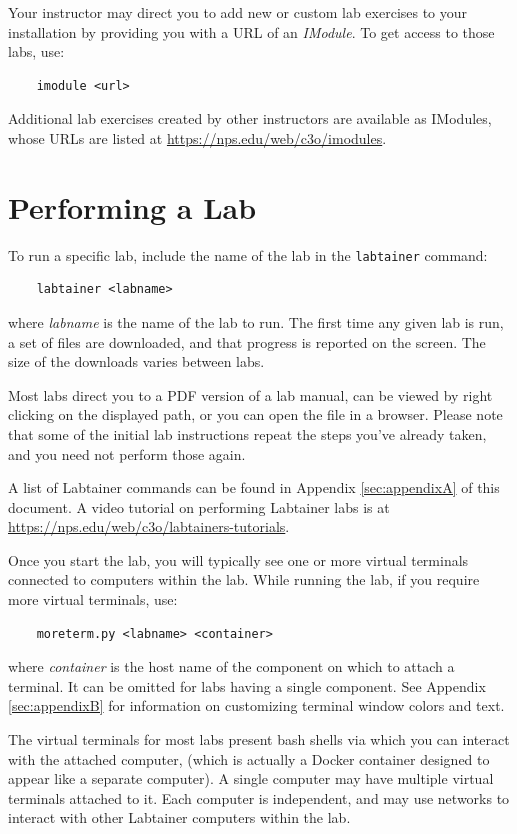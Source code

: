 \documentclass[12pt]{article}
\begin{document}
Your instructor may direct you to add new or custom lab exercises to your installation by providing you with a URL of an \textit{IModule}.
To get access to those labs, use:
\begin{verbatim}
    imodule <url>
\end{verbatim}
Additional lab exercises created by other instructors are available as IModules, whose URLs are listed at \url{https://nps.edu/web/c3o/imodules}.

\section{Performing a Lab}
\label{performing}

To run a specific lab, include the name of the lab in the {\tt labtainer} command:
\begin{verbatim}
    labtainer <labname>
\end{verbatim}
\noindent where \textit{labname} is the name of the lab to run.  
The first time any given lab is run, a set of files are downloaded, and
that progress is reported on the screen.  The size of the downloads varies
between labs.

Most labs direct you to a PDF version of a lab manual, can 
be viewed by right clicking on the displayed path, or you can open the file in a browser.
Please note that some of the initial lab instructions repeat the steps you've already taken, and you need
not perform those again. 

A list of Labtainer commands can be found in Appendix \ref{sec:appendixA} of this document. 
A video tutorial on performing Labtainer labs is at \url{https://nps.edu/web/c3o/labtainers-tutorials}.

Once you start the lab, you will typically see one or more virtual terminals connected to computers within
the lab.  While running the lab, if you require more virtual terminals, use:
\begin{verbatim}
    moreterm.py <labname> <container>
\end{verbatim}
\noindent where \textit{container} is the host name of the component on which to attach a terminal.  
It can be omitted for labs having a single component.  See Appendix \ref{sec:appendixB} for information
on customizing terminal window colors and text.

The virtual terminals for most labs present bash shells via which you can interact
with the attached computer, (which is actually a Docker container designed to appear
like a separate computer).  A single computer
may have multiple virtual terminals attached to it.  Each computer is independent, and 
may use networks to interact with other Labtainer computers within the lab.  
\end{document}
